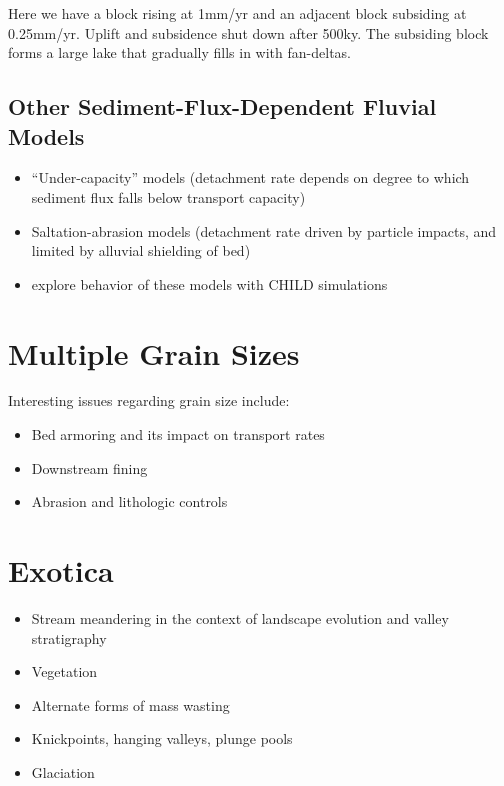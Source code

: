 \documentclass[12pt]{amsart}
\begin{document}
\noindent
Here we have a block rising at 1mm/yr and an adjacent block subsiding at 0.25mm/yr. Uplift and subsidence shut down after 500ky. The subsiding block forms a large lake that gradually fills in with fan-deltas.

\subsection{Other Sediment-Flux-Dependent Fluvial Models}

\begin{itemize}
\item ``Under-capacity'' models (detachment rate depends on degree to which sediment flux falls below transport capacity)
\item Saltation-abrasion models (detachment rate driven by particle impacts, and limited by alluvial shielding of bed)
\item \citet{gasparini2007predictions} explore behavior of these models with CHILD simulations
\end{itemize}

\section{Multiple Grain Sizes}

Interesting issues regarding grain size include:
\begin{itemize}
\item Bed armoring and its impact on transport rates
\item Downstream fining
\item Abrasion and lithologic controls
\end{itemize}

\section{Exotica}

\begin{itemize}
\item Stream meandering in the context of landscape evolution and valley stratigraphy \citep{clevis2006simple,clevis2006geoarchaeological}
\item Vegetation \citep{collins2004modeling,istanbulluoglu2005vegetation}
\item Alternate forms of mass wasting \citep{densmore1998landsliding,lancaster2003effects,istanbulluoglu2005implications}
\item Knickpoints, hanging valleys, plunge pools \citep{flores2006development,crosby2007formation}
\item Glaciation \citep{herman2006fluvial,herman2007tectonomorphic,herman2008evolution}
\end{itemize}
\end{document}
